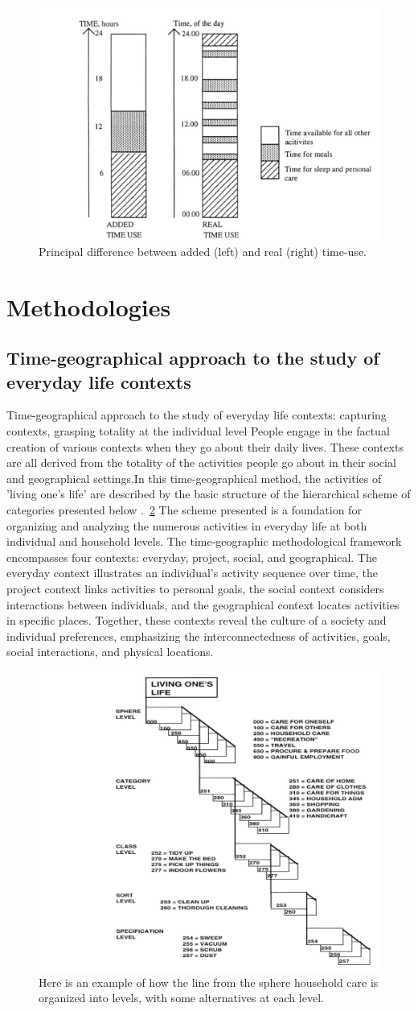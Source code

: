 \documentclass{chart}
\begin{document}
\begin{figure}
	\centering
	\includegraphics[width=0.45\linewidth]{fig2}
	\caption{Principal difference between added (left) and real (right) time-use.} 
	\label{fig:task management}
\end{figure}

\section{Methodologies} 
\subsection{Time-geographical approach to the study of everyday life contexts} 
Time-geographical approach to the study of everyday life contexts: capturing contexts, grasping totality at the individual level People engage in the factual creation of various contexts when they go about their daily lives. These contexts are all derived from the totality of the activities people go about in their social and geographical settings.In this time-geographical method, the activities of
'living one's life' are described by the basic structure of the hierarchical scheme of categories presented below .~\cref{fig:Activity categorization scheme.} The scheme presented is a foundation for organizing and analyzing the numerous activities in everyday life at both individual and household levels. The time-geographic methodological framework encompasses four contexts: everyday, project, social, and geographical. The everyday context illustrates an individual's activity sequence over time, the project context links activities to personal goals, the social context considers interactions between individuals, and the geographical context locates activities in specific places. Together, these contexts reveal the culture of a society and individual preferences, emphasizing the interconnectedness of activities, goals, social interactions, and physical locations.
\begin{figure}
	\centering
	\includegraphics[width=0.45\linewidth]{fig3}
	\caption{Here is an example of how the line from the sphere household care is organized into levels, with some alternatives at each level.} 
	\label{fig:Activity categorization scheme.}
\end{figure}
\end{document}
